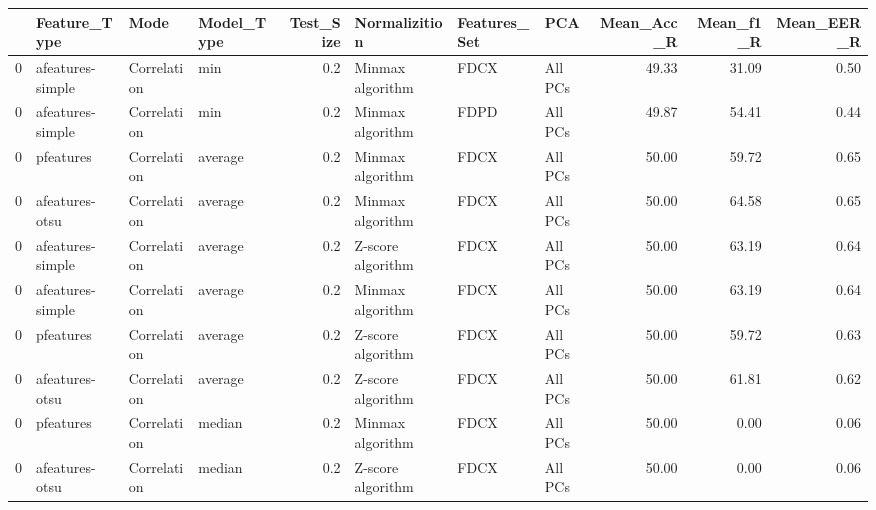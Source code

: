 \begin{tabular}{llllrlllrrr}
\toprule
{} &      Feature\_Type &         Mode & Model\_Type &  Test\_Size &      Normalizition & Features\_Set &      PCA &  Mean\_Acc\_R &  Mean\_f1\_R &  Mean\_EER\_R \\
\midrule
0 &  afeatures-simple &  Correlation &        min &        0.2 &   Minmax algorithm &         FDCX &  All PCs &       49.33 &      31.09 &        0.50 \\
0 &  afeatures-simple &  Correlation &        min &        0.2 &   Minmax algorithm &         FDPD &  All PCs &       49.87 &      54.41 &        0.44 \\
0 &         pfeatures &  Correlation &    average &        0.2 &   Minmax algorithm &         FDCX &  All PCs &       50.00 &      59.72 &        0.65 \\
0 &    afeatures-otsu &  Correlation &    average &        0.2 &   Minmax algorithm &         FDCX &  All PCs &       50.00 &      64.58 &        0.65 \\
0 &  afeatures-simple &  Correlation &    average &        0.2 &  Z-score algorithm &         FDCX &  All PCs &       50.00 &      63.19 &        0.64 \\
0 &  afeatures-simple &  Correlation &    average &        0.2 &   Minmax algorithm &         FDCX &  All PCs &       50.00 &      63.19 &        0.64 \\
0 &         pfeatures &  Correlation &    average &        0.2 &  Z-score algorithm &         FDCX &  All PCs &       50.00 &      59.72 &        0.63 \\
0 &    afeatures-otsu &  Correlation &    average &        0.2 &  Z-score algorithm &         FDCX &  All PCs &       50.00 &      61.81 &        0.62 \\
0 &         pfeatures &  Correlation &     median &        0.2 &   Minmax algorithm &         FDCX &  All PCs &       50.00 &       0.00 &        0.06 \\
0 &    afeatures-otsu &  Correlation &     median &        0.2 &  Z-score algorithm &         FDCX &  All PCs &       50.00 &       0.00 &        0.06 \\
\bottomrule
\end{tabular}
